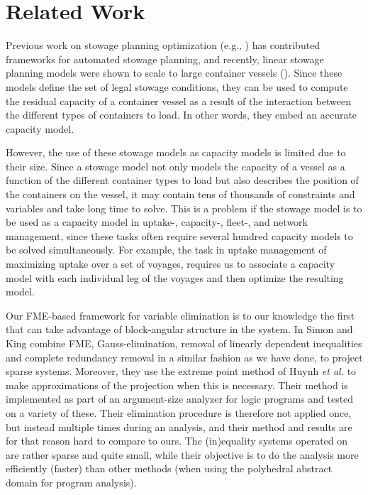 \documentclass[citeauthoryear]{llncs}
\begin{document}
\section{Related Work}
\label{sec:preWork}
Previous work on stowage planning optimization (e.g., \cite{roach00,kimkang02,ambrosino04,low09,delgado09,pacino12}) has contributed frameworks for automated stowage planning, and recently, linear stowage planning models were shown to scale to large container vessels (\cite{pacino11,AlbertosThesis}). Since these models define the set of legal stowage conditions, they can be used to compute the residual capacity of a container vessel as a result of the interaction between the different types of containers to load. In other words, they embed an accurate capacity model. 

However, the use of these stowage models as capacity models is limited due to their size. Since a stowage model not only models the capacity of a vessel as a function of the different container types to load but also describes the position of the containers on the vessel, it may contain tens of thousands of constraints and variables and take long time to solve. This is a problem if the stowage model is to be used as a capacity model in uptake-, capacity-, fleet-, and network management, since these tasks often require several hundred capacity models to be solved simultaneously. For example, the task in uptake management of maximizing uptake over a set of voyages, requires us to associate a capacity model with each individual leg of the voyages and then optimize the resulting model.  

Our FME-based framework for variable elimination is to our knowledge the first that can take advantage of block-angular structure in the system. In \cite{simon05} Simon and King combine FME, Gauss-elimination, removal of linearly dependent inequalities and complete redundancy removal in a similar fashion as we have done, to project sparse systems. Moreover, they use the extreme point method of Huynh \textit{et al.} \cite{huynh92} to make approximations of the projection when this is necessary. Their method is implemented as part of an argument-size analyzer for logic programs and tested on a variety of these. Their elimination procedure is therefore not applied once, but instead multiple times during an analysis, and their method and results are for that reason hard to compare to ours. The (in)equality systems operated on are rather sparse and quite small, while their objective is to do the analysis more efficiently (faster) than other methods (when using the polyhedral abstract domain for program analysis). 
\end{document}
